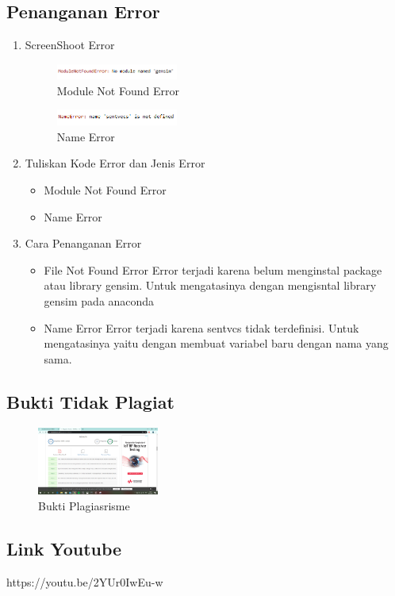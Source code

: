 \subsection{Penanganan Error}
\begin{enumerate}
\item ScreenShoot Error
	\begin{figure}[H]
		\includegraphics[width=4cm]{figures/1174054/5/error2.png}
		\centering
		\caption{Module Not Found Error}
	\end{figure}
	\begin{figure}[H]
		\includegraphics[width=4cm]{figures/1174054/5/error1.png}
		\centering
		\caption{Name Error}
	\end{figure}

	\item Tuliskan Kode Error dan Jenis Error
	\begin{itemize}
		\item Module Not Found Error
		\item Name Error

	\end{itemize}
	\item Cara Penanganan Error
	\begin{itemize}
		\item File Not Found Error
		\hfill\break
		Error terjadi karena belum menginstal package atau library gensim. Untuk mengatasinya dengan mengisntal library gensim pada anaconda
		\item Name Error
		\hfill\break
		Error terjadi karena sentvcs tidak terdefinisi. Untuk mengatasinya yaitu dengan membuat variabel baru dengan nama yang sama.
	\end{itemize}
\end{enumerate}


\subsection{Bukti Tidak Plagiat}
\begin{figure}[H]
	\includegraphics[width=4cm]{figures/1174054/5/plagiarisme.png}
	\centering
	\caption{Bukti Plagiasrisme}
\end{figure}

\subsection{Link Youtube}
https://youtu.be/2YUr0IwEu-w